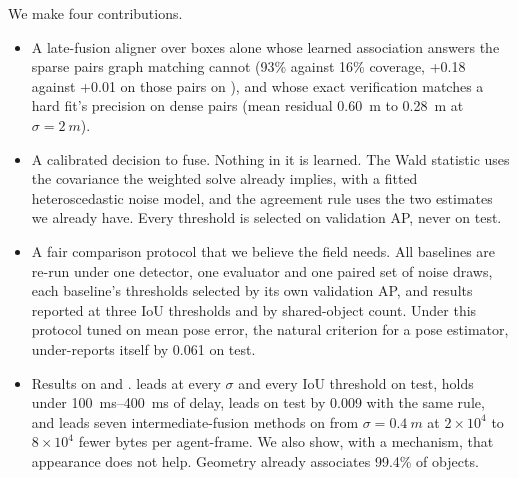 We make four contributions.
\begin{itemize}
  \item A late-fusion aligner over boxes alone whose learned association answers the sparse pairs graph matching cannot (93\% against 16\% coverage, +0.18 against +0.01  on those pairs on \opvv), and whose exact verification matches a hard fit's precision on dense pairs (mean residual \SI{0.60}{m} to \SI{0.28}{m} at $\sigma=\SI{2}{m}$).
  \item A calibrated decision to fuse. Nothing in it is learned. The Wald statistic uses the covariance the weighted solve already implies, with a fitted heteroscedastic noise model, and the agreement rule uses the two estimates we already have. Every threshold is selected on validation AP, never on test.
  \item A fair comparison protocol that we believe the field needs. All baselines are re-run under one detector, one evaluator and one paired set of noise draws, each baseline's thresholds selected by its own validation AP, and results reported at three IoU thresholds and by shared-object count. Under this protocol \freealign tuned on mean pose error, the natural criterion for a pose estimator, under-reports itself by 0.061  on \vxreal test.
  \item Results on \vxreal and \opvv. \paper leads \freealign at every $\sigma$ and every IoU threshold on \vxreal test, holds under \SIrange{100}{400}{ms} of delay, leads \freealign on \opvv test by 0.009  with the same rule, and leads seven intermediate-fusion methods on \opvv from $\sigma=\SI{0.4}{m}$ at $2\times10^4$ to $8\times10^4$ fewer bytes per agent-frame. We also show, with a mechanism, that appearance does not help. Geometry already associates 99.4\% of objects.
\end{itemize}
